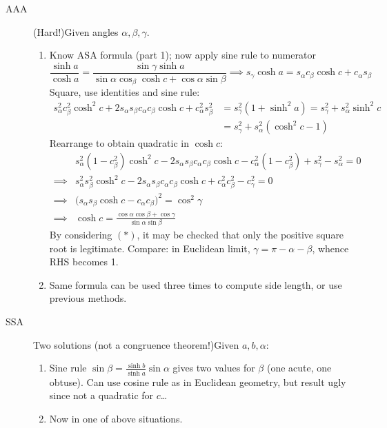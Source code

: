 \begin{description}
	\item[AAA] (Hard!)\lstsp Given angles $\alpha,\beta,\gamma$.
	\begin{enumerate}
	  \item Know ASA formula (part 1); now apply sine rule to numerator
	  \[\frac{\sinh a}{\cosh a}=\frac{\sin\gamma\sinh a}{\sin\alpha\cos_\beta\cosh c+ \cos\alpha\sin\beta} \implies s_\gamma\cosh a=s_\alpha c_\beta\cosh c+c_\alpha s_\beta \tag{$\ast$}\]
	  Square, use identities and sine rule:
		\begin{align*}
		s^2_\alpha c^2_\beta\cosh^2c+2s_\alpha s_\beta c_\alpha c_\beta\cosh c+c_\alpha^2s^2_\beta &=s^2_\gamma(1+\sinh^2a) =s_\gamma^2+s_\alpha^2\sinh^2c\\
		&=s_\gamma^2+s_\alpha^2(\cosh^2c-1)
		\end{align*}
		Rearrange to obtain quadratic in $\cosh c$:
		\begin{align*}
		&s_\alpha^2(1-c_\beta^2)\cosh^2c-2s_\alpha s_\beta c_\alpha c_\beta\cosh c -c_\alpha^2(1-c^2_\beta)+s^2_\gamma-s^2_\alpha=0\\
		\implies &s_\alpha^2s_\beta^2\cosh^2c-2s_\alpha s_\beta c_\alpha c_\beta\cosh c +c_\alpha^2c^2_\beta-c^2_\gamma=0\\
		\implies &\bigl(s_\alpha s_\beta\cosh c-c_\alpha c_\beta\bigr)^2=\cos^2\gamma\\
		\implies &\cosh c=\frac{\cos\alpha\cos\beta+\cos\gamma}{\sin\alpha\sin\beta}
		\end{align*}
		By considering $(\ast)$, it may be checked that only the positive square root is legitimate. Compare: in Euclidean limit, $\gamma=\pi-\alpha-\beta$, whence RHS becomes 1.
		\item Same formula can be used three times to compute side length, or use previous methods.
	\end{enumerate}
	  
	\item[SSA] Two solutions (not a congruence theorem!)\lstsp Given $a,b,\alpha$:
	\begin{enumerate}
	  \item Sine rule $\sin\beta=\frac{\sinh b}{\sinh a}\sin\alpha$ gives two values for $\beta$ (one acute, one obtuse). Can use cosine rule as in Euclidean geometry, but result ugly since not a quadratic for $c$\ldots
	  \item Now in one of above situations.
	\end{enumerate}
\end{description}